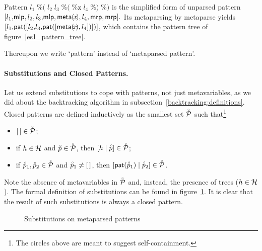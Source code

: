 \smallskip

\noindent Pattern \(l_1 \; \texttt{\%(} \; l_2 \; l_3 \; \texttt{\%(}
\; \texttt{\%x} \; l_4 \; \texttt{\%)} \; \texttt{\%)}\) is the
simplified form of unparsed pattern \([l_1, \!\textsf{mlp}, l_2, l_3, \!\textsf{mlp},
\textsf{meta}(\!x\!), l_4, \textsf{mrp}, \textsf{mrp}].\) Its meta\-parsing by
\textsf{meta\-parse} yields \([l_1, \!\textsf{pat}([l_2, \!l_3,
\!\textsf{pat}([\textsf{meta}(\!x\!), l_4])])]\), which contains the pattern tree of
figure~\ref{es1_pattern_tree}.
\begin{remark}
Thereupon we write `pattern' instead of `meta\-parsed pattern'.
\end{remark}


\paragraph{Substitutions and Closed Patterns.}

Let us extend substitutions to cope with patterns, not just
meta\-variables, as we did about the back\-tracking algorithm in
sub\-section~\ref{backtracking:definitions}. Closed patterns are
defined inductively as the smallest set \(\accentset{\circ}{\cal P}\) such
that\footnote{The circles above are meant to suggest
self\hyp{}containment.}
\begin{itemize}

  \item \([\,] \in \accentset{\circ}{\cal P}\);

  \item if \(h \in {\cal H}\) and \(\accentset{\circ}{p} \in \accentset{\circ}{\cal P}\),
        then \([{h}\mid{\accentset{\circ}{p}}] \in \accentset{\circ}{\cal P}\);

  \item if \(\accentset{\circ}{p}_1, \accentset{\circ}{p}_2 \in \accentset{\circ}{\cal P}\) and
    \(\accentset{\circ}{p}_1 \neq [\,]\), then
    \([{\textsf{pat}(\accentset{\circ}{p}_1)}\mid{\accentset{\circ}{p}_2}] \in \accentset{\circ}{\cal P}\).

\end{itemize}
Note the absence of meta\-variables in \(\accentset{\circ}{\cal P}\) and,
instead, the presence of trees (\(h \in {\cal H}\)). The formal
definition of substitutions can be found in
figure~\ref{es1_subst_def}. It is clear that the result of such
substitutions is always a closed pattern.
\begin{figure}[H]
\caption{Substitutions on meta\-parsed patterns%
\label{es1_subst_def}}
\end{figure}


